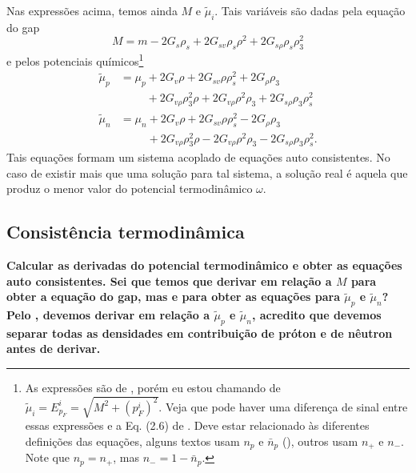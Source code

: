 Nas expressões acima, temos ainda $M$ e $\tilde\mu_i$. Tais variáveis são dadas pela equação do gap
\begin{equation}
    M = m - 2G_s\rho_s + 2G_{sv}\rho_s\rho^2 + 2 G_{s\rho}\rho_s\rho_3^2
\end{equation}
%
e pelos potenciais químicos\footnote[][-3cm]{As expressões são de \cite{Pais}, porém eu estou chamando de $\tilde\mu_i = E_{p_F}^i = \sqrt{M^2 + (p_F^i)^2}$. Veja que pode haver uma diferença de sinal entre essas expressões e a Eq. (2.6) de \cite{japoneses}. Deve estar relacionado às diferentes definições das equações, alguns textos usam $n_p$ e $\bar{n}_p$ (\cite{Buballa}), outros usam $n_+$ e $n_-$. Note que $n_p = n_+$, mas $n_- = 1 - \bar{n}_p$.}
\begin{align}
    \tilde\mu_p &= \mu_p + 2G_v\rho + 2G_{sv}\rho\rho_s^2 + 2 G_\rho\rho_3 \nonumber \\
    &\phantom{= \mu_p} + 2G_{v\rho}\rho_3^2\rho + 2G_{v\rho}\rho^2 \rho_3 + 2G_{s\rho}\rho_3\rho_s^2  \\
    \tilde\mu_n &= \mu_n + 2G_v\rho + 2G_{sv}\rho\rho_s^2 - 2 G_\rho\rho_3 \nonumber \\
    &\phantom{=\mu_n} + 2G_{v\rho}\rho_3^2\rho - 2G_{v\rho}\rho^2 \rho_3 - 2G_{s\rho}\rho_3\rho_s^2.
\end{align}
%
Tais equações formam um sistema acoplado de equações auto consistentes. No caso de existir mais que uma solução para tal sistema, a solução real é aquela que produz o menor valor do potencial termodinâmico $\omega$.

\subsection{Consistência termodinâmica}

\textbf{Calcular as derivadas do potencial termodinâmico e obter as equações auto consistentes. Sei que temos que derivar em relação a $M$ para obter a equação do gap, mas e para obter as equações para $\tilde\mu_p$ e $\tilde\mu_n$? Pelo \cite{Buballa}, devemos derivar em relação a $\tilde\mu_p$ e $\tilde\mu_n$, acredito que devemos separar todas as densidades em contribuição de próton e de nêutron antes de derivar.}





